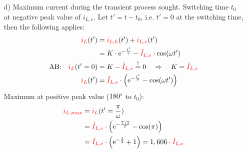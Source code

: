 {\begin{itemize}
    That is, for a vanishing transient state (no settling process), the following applies:
    \begin{align*}
        &\text{IC:}&\eci{i_L}(t_0) = \eci{i_{L,e}}(t_0) &= \eci{\hat{I}_{L,e}} \cdot \sin(\omega t_0 + \varphi) \overset{!}= 0 &
            &\Rightarrow \eci{i_L}(t')=\eci{i_{L,e}}(t') \Leftrightarrow \eci{i_{L,f}}(t')=0\\
        &&\Leftrightarrow \omega t_0 + \varphi &\overset{!}{=} 0 + n\cdot \pi &
            &\text{with} \quad n \in \mathbb{N} \\
        &&t_{min} &= \frac{n\cdot \pi - \varphi}{\omega} &
            &\text{corresponds to zero crossings of $\eci{i_{L,e}}$}\\
        \end{align*}
        And for maximum transient state (switching point offset by $90\degree$), the following applies:
        \begin{align*}
        &&t_{max} &= \frac{n\cdot \pi - \varphi}{\omega} + \frac{T}{4} &
            &\text{corresponds to extreme points of $\eci{i_{L,e}}$}
    \end{align*}
    \item[d)] Maximum current during the transient process sought.
        Switching time $t_0$ at negative peak value of $i_{L,e}$.
        Let $t' = t - t_0$, i.e. $t'=0$ at the switching time, then the following applies:
    \begin{align*}
        {\color{red}i_L}(t') &= {\color{red}i_{L,h}}(t') + {\color{red}i_{L,e}}(t') \\
        &= K \cdot \mathrm{e}^{-\frac{t'}{\tau}} - {\color{red}\hat{I}_{L,e}} \cdot \cos(\omega t')\\
        \text{AB:}\quad {\color{red}i_L}(t'=0) &= K - {\color{red}\hat{I}_{L,e}}  \overset{!}{=}0 \quad \Rightarrow \quad K = {\color{red}\hat{I}_{L,e}}\\
        {\color{red}i_L}(t') &= {\color{red}\hat{I}_{L,e}} \cdot \left( \mathrm{e}^{-\frac{t'}{\tau}} - \cos(\omega t') \right) \\
        \end{align*}
        Maximum at positive peak value ($180\degree$ to $t_0$):
        \begin{align*}
        {\color{red}i_{L,max}} &= {\color{red}i_L}(t' = \frac{\pi}{\omega}) \\
        &= {\color{red}\hat{I}_{L,e}} \cdot \left( \mathrm{e}^{-\frac{T/2}{T}} - \cos(\pi) \right) \\
        &= {\color{red}\hat{I}_{L,e}} \cdot \left( \mathrm{e}^{-\frac{1}{2}} + 1\right) = 1,606 \cdot {\color{red}\hat{I}_{L,e}}
    \end{align*}
    \end{itemize}
}